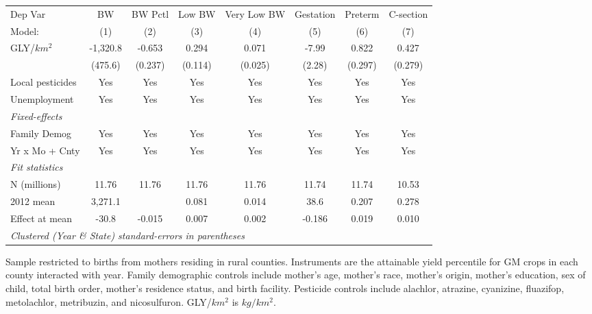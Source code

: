 \begingroup
\centering
\begin{threeparttable}[b]
   \begin{tabular}{lccccccc}
      \toprule
      Dep Var          & BW       & BW Pctl & Low BW  & Very Low BW & Gestation & Preterm & C-section\\  
      Model:           & (1)      & (2)     & (3)     & (4)         & (5)       & (6)     & (7)\\  
      \midrule 
      GLY/$km^2$       & -1,320.8 & -0.653  & 0.294   & 0.071       & -7.99     & 0.822   & 0.427\\   
                       & (475.6)  & (0.237) & (0.114) & (0.025)     & (2.28)    & (0.297) & (0.279)\\   
      Local pesticides & Yes      & Yes     & Yes     & Yes         & Yes       & Yes     & Yes\\  
      Unemployment     & Yes      & Yes     & Yes     & Yes         & Yes       & Yes     & Yes\\  
      \midrule
      \emph{Fixed-effects}\\
      Family Demog     & Yes      & Yes     & Yes     & Yes         & Yes       & Yes     & Yes\\  
      Yr x Mo + Cnty   & Yes      & Yes     & Yes     & Yes         & Yes       & Yes     & Yes\\  
      \midrule
      \emph{Fit statistics}\\
      N (millions)     & 11.76    & 11.76   & 11.76   & 11.76       & 11.74     & 11.74   & 10.53\\  
      2012 mean        & 3,271.1  &         & 0.081   & 0.014       & 38.6      & 0.207   & 0.278\\  
      Effect at mean   & -30.8    & -0.015  & 0.007   & 0.002       & -0.186    & 0.019   & 0.010\\  
      \midrule
      \multicolumn{8}{l}{\emph{Clustered (Year \& State) standard-errors in parentheses}}\\
   \end{tabular}
   
   \begin{tablenotes}\item Sample restricted to births from mothers residing in rural counties. Instruments are the attainable yield percentile for GM crops in each county interacted with year. Family demographic controls include mother's age, mother's race, mother's origin, mother's education, sex of child, total birth order, mother's residence status, and birth facility. Pesticide controls include alachlor, atrazine, cyanizine, fluazifop, metolachlor, metribuzin, and nicosulfuron. GLY/$km^2$ is $kg/km^2$.
   \end{tablenotes}
\end{threeparttable}
\par\endgroup

